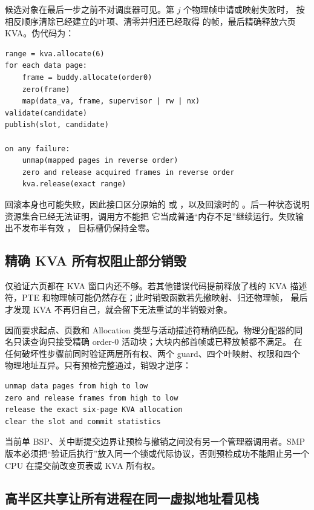 候选对象在最后一步之前不对调度器可见。第 \(j\) 个物理帧申请或映射失败时，
 按相反顺序清除已经建立的叶项、清零并归还已经取得
的帧，最后精确释放六页 KVA。伪代码为：

\begin{verbatim}
range = kva.allocate(6)
for each data page:
    frame = buddy.allocate(order0)
    zero(frame)
    map(data_va, frame, supervisor | rw | nx)
validate(candidate)
publish(slot, candidate)

on any failure:
    unmap(mapped pages in reverse order)
    zero and release acquired frames in reverse order
    kva.release(exact range)
\end{verbatim}

回滚本身也可能失败，因此接口区分原始的
 或 ，以及回滚时的
。后一种状态说明资源集合已经无法证明，调用方不能把
它当成普通“内存不足”继续运行。失败输出不发布半有效 ，
目标槽仍保持全零。

\subsection{精确 KVA 所有权阻止部分销毁}

仅验证六页都在 KVA 窗口内还不够。若其他错误代码提前释放了栈的 KVA
描述符，PTE 和物理帧可能仍然存在；此时销毁函数若先撤映射、归还物理帧，
最后才发现 KVA 不再归自己，就会留下无法重试的半销毁对象。

 因而要求起点、页数和
Allocation 类型与活动描述符精确匹配。物理分配器的同名只读查询只接受精确
order-0 活动块；大块内部首帧或已释放帧都不满足。 在
任何破坏性步骤前同时验证两层所有权、两个 guard、四个叶映射、权限和四个
物理地址互异。只有预检完整通过，销毁才逆序：

\begin{verbatim}
unmap data pages from high to low
zero and release frames from high to low
release the exact six-page KVA allocation
clear the slot and commit statistics
\end{verbatim}

当前单 BSP、关中断提交边界让预检与撤销之间没有另一个管理器调用者。SMP
版本必须把“验证后执行”放入同一个锁或代际协议，否则预检成功不能阻止另一个
CPU 在提交前改变页表或 KVA 所有权。

\subsection{高半区共享让所有进程在同一虚拟地址看见栈}

